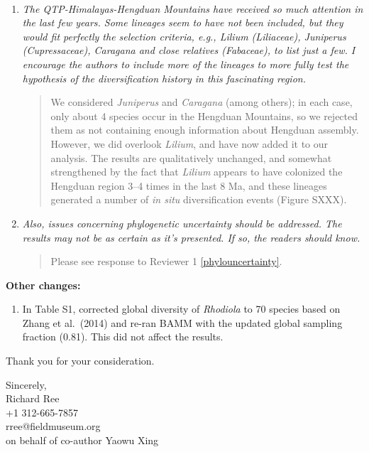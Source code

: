 \documentclass[11pt]{letter}
\begin{document}
\begin{letter}{ \\

}
\begin{enumerate}
\item \textit{The QTP-Himalayas-Hengduan Mountains have received so
    much attention in the last few years. Some lineages seem to have
    not been included, but they would fit perfectly the selection
    criteria, e.g., Lilium (Liliaceae), Juniperus (Cupressaceae),
    Caragana and close relatives (Fabaceae), to list just a few. I
    encourage the authors to include more of the lineages to more
    fully test the hypothesis of the diversification history in this
    fascinating region.}

  \begin{quote}
    We considered \textit{Juniperus} and \textit{Caragana} (among
    others); in each case, only about 4 species occur in the Hengduan
    Mountains, so we rejected them as not containing enough
    information about Hengduan assembly. However, we did overlook
    \textit{Lilium}, and have now added it to our analysis. The
    results are qualitatively unchanged, and somewhat strengthened by
    the fact that \textit{Lilium} appears to have colonized the
    Hengduan region 3--4 times in the last 8 Ma, and these lineages
    generated a number of \textit{in situ} diversification events
    (Figure SXXX).
  \end{quote}

\item \textit{Also, issues concerning phylogenetic uncertainty should
    be addressed. The results may not be as certain as it's
    presented. If so, the readers should know.}

  \begin{quote}
    Please see response to Reviewer 1 \ref{phylouncertainty}.
  \end{quote}

\end{enumerate}

\textbf{Other changes:}

\begin{enumerate}

\item In Table S1, corrected global diversity of \textit{Rhodiola} to
  70 species based on Zhang et al.\ (2014) and re-ran BAMM with the
  updated global sampling fraction (0.81). This did not affect the
  results.

\end{enumerate}

Thank you for your consideration.


\closing{Sincerely,\\
  \bigskip
  Richard Ree\\
  +1 312-665-7857\\
  rree@fieldmuseum.org\\
  \medskip on behalf of co-author Yaowu Xing
  }


\end{letter}
\end{document}
